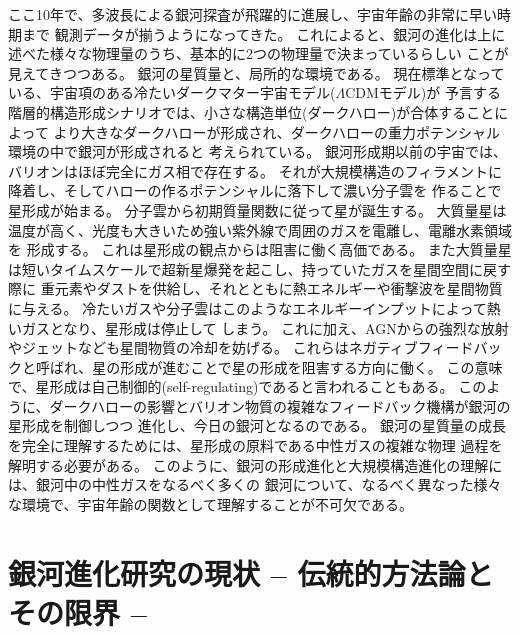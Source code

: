 ここ10年で、多波長による銀河探査が飛躍的に進展し、宇宙年齢の非常に早い時期まで
観測データが揃うようになってきた。
これによると、銀河の進化は上に述べた様々な物理量のうち、基本的に2つの物理量で決まっているらしい
ことが見えてきつつある。
銀河の星質量と、局所的な環境である。
現在標準となっている、宇宙項のある冷たいダークマター宇宙モデル($\Lambda$CDMモデル)が
予言する階層的構造形成シナリオでは、小さな構造単位(ダークハロー)が合体することによって
より大きなダークハローが形成され、ダークハローの重力ポテンシャル環境の中で銀河が形成されると
考えられている。
銀河形成期以前の宇宙では、バリオンはほぼ完全にガス相で存在する。
それが大規模構造のフィラメントに降着し、そしてハローの作るポテンシャルに落下して濃い分子雲を
作ることで星形成が始まる。
分子雲から初期質量関数に従って星が誕生する。
大質量星は温度が高く、光度も大きいため強い紫外線で周囲のガスを電離し、電離水素領域を
形成する。
これは星形成の観点からは阻害に働く高価である。
また大質量星は短いタイムスケールで超新星爆発を起こし、持っていたガスを星間空間に戻す際に
重元素やダストを供給し、それとともに熱エネルギーや衝撃波を星間物質に与える。
冷たいガスや分子雲はこのようなエネルギーインプットによって熱いガスとなり、星形成は停止して
しまう。
これに加え、AGNからの強烈な放射やジェットなども星間物質の冷却を妨げる。
これらはネガティブフィードバックと呼ばれ、星の形成が進むことで星の形成を阻害する方向に働く。
この意味で、星形成は自己制御的(self-regulating)であると言われることもある。
このように、ダークハローの影響とバリオン物質の複雑なフィードバック機構が銀河の星形成を制御しつつ
進化し、今日の銀河となるのである。
銀河の星質量の成長を完全に理解するためには、星形成の原料である中性ガスの複雑な物理
過程を解明する必要がある。
このように、銀河の形成進化と大規模構造進化の理解には、銀河中の中性ガスをなるべく多くの
銀河について、なるべく異なった様々な環境で、宇宙年齢の関数として理解することが不可欠である。

\section{銀河進化研究の現状 -- 伝統的方法論とその限界 --}\label{galaxy.s0.5}


